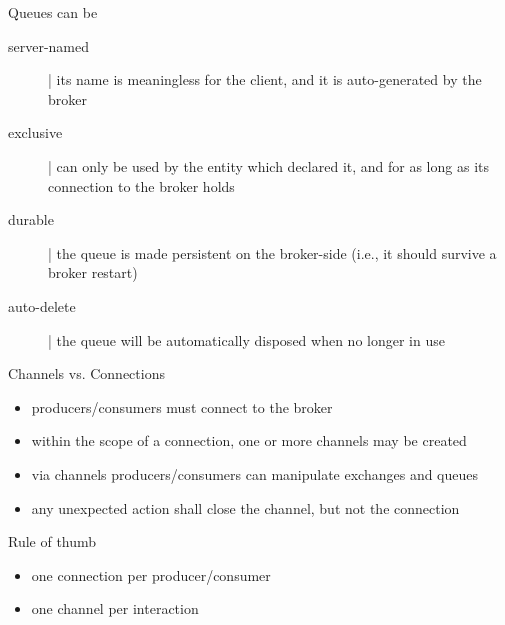 \documentclass{beamer}\mode<presentation>{\usetheme{AMSBolognaFC}}
\begin{document}
\begin{frame}{Queues can be}

    \begin{description}
        \item[server-named] | its name is meaningless for the client, and it is auto-generated by the broker

        \vfill

        \item[exclusive] | can only be used by the entity which declared it, and for as long as its connection to the broker holds

        \vfill

        \item[durable] | the queue is made persistent on the broker-side (i.e., it should survive a broker restart)

        \vfill

        \item[auto-delete] | the queue will be automatically disposed when no longer in use
    \end{description}

\end{frame}

\begin{frame}{Channels vs. Connections}

    \begin{itemize}
        \item producers/consumers must \alert{connect} to the broker

        \vfill

        \item within the scope of a connection, one or more \alert{channels} may be created

        \vfill

        \item via channels producers/consumers can manipulate exchanges and queues

        \vfill

        \item any unexpected action shall close the channel, but not the connection

    \end{itemize}

    \vfill

    \begin{block}{Rule of thumb}
        \begin{itemize}
            \item one connection per producer/consumer
            \item one channel per interaction
        \end{itemize}
    \end{block}

\end{frame}
\end{document}
